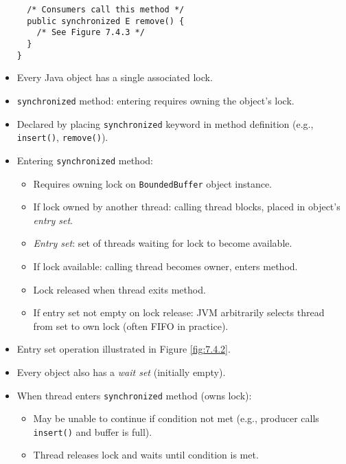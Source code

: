 \begin{itemize}
\begin{verbatim}
  /* Consumers call this method */
  public synchronized E remove() {
    /* See Figure 7.4.3 */
  }
}
    \end{verbatim}
    \item Every Java object has a single associated lock.
    \item \texttt{synchronized} method: entering requires owning the object's lock.
    \item Declared by placing \texttt{synchronized} keyword in method definition (e.g., \texttt{insert()}, \texttt{remove()}).
    \item Entering \texttt{synchronized} method:
    \begin{itemize}
        \item Requires owning lock on \texttt{BoundedBuffer} object instance.
        \item If lock owned by another thread: calling thread blocks, placed in object's \textit{entry set}.
        \item \textit{Entry set}: set of threads waiting for lock to become available.
        \item If lock available: calling thread becomes owner, enters method.
        \item Lock released when thread exits method.
        \item If entry set not empty on lock release: JVM arbitrarily selects thread from set to own lock (often FIFO in practice).
    \end{itemize}
    \item Entry set operation illustrated in Figure \ref{fig:7.4.2}.
    \item Every object also has a \textit{wait set} (initially empty).
    \item When thread enters \texttt{synchronized} method (owns lock):
    \begin{itemize}
        \item May be unable to continue if condition not met (e.g., producer calls \texttt{insert()} and buffer is full).
        \item Thread releases lock and waits until condition is met.
    \end{itemize}
\end{itemize}

